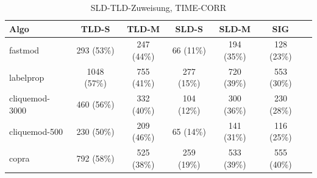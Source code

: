 {\footnotesize
\begin{table}[h]
  \centering
  \begin{tabular}{l|c|c|c|c|c|c}
    Algo & TLD-S & TLD-M & SLD-S & SLD-M & SIG \\
    \hline
    fastmod & 293 (53\%) & 247 (44\%) & 66 (11\%) & 194 (35\%) & 128
    (23\%) \\
    \hline
    labelprop & 1048 (57\%) & 755 (41\%) & 277 (15\%) & 720 (39\%) &
    553 (30\%) \\
    \hline
    cliquemod-3000 & 460 (56\%) & 332 (40\%) & 104 (12\%) & 300 (36\%)
    & 230 (28\%) \\
    \hline
    cliquemod-500 & 230 (50\%) & 209 (46\%) & 65 (14\%) & 141 (31\%) &
    116 (25\%) \\
    \hline
    copra & 792 (58\%) & 525 (38\%) & 259 (19\%) & 533 (39\%) & 555 (40\%)

  \end{tabular}
  \caption{SLD-TLD-Zuweisung, TIME-CORR}
  \label{tab:assign}
\end{table}
}

